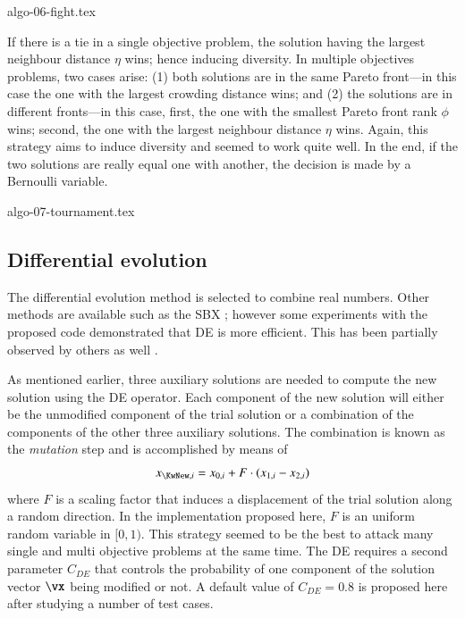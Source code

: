 \documentclass[final,5p,times,twocolumn]{elsarticle}
\begin{document}
{algo-06-fight.tex}


If there is a tie in a single objective problem, the solution having the largest neighbour distance
$\eta$ wins; hence inducing diversity. In multiple objectives problems, two cases arise: (1) both
solutions are in the same Pareto front---in this case the one with the largest crowding distance
wins; and (2) the solutions are in different fronts---in this case, first, the one with the smallest
Pareto front rank $\phi$ wins; second, the one with the largest neighbour distance $\eta$ wins.
Again, this strategy aims to induce diversity and seemed to work quite well. In the end, if the two
solutions are really equal one with another, the decision is made by a Bernoulli variable.


{algo-07-tournament.tex}



\subsection{Differential evolution}
\label{sec:DE}

The differential evolution \citep{storn:95,price:05} method is selected to combine real numbers.
Other methods are available such as the SBX \citep{deb:95a}; however some experiments with the
proposed code demonstrated that DE is more efficient. This has been partially observed by others as
well \citep{tiwari:11}.

As mentioned earlier, three auxiliary solutions are needed to compute the new solution using the DE
operator. Each component of the new solution will either be the unmodified component of the trial
solution or a combination of the components of the other three auxiliary solutions. The combination
is known as the \emph{mutation} step \citep{price:05} and is accomplished by means of
\begin{equation}
    x_{\KwNew,i} = x_{0,i} + F\cdot(x_{1,i} - x_{2,i})
\end{equation}
where $F$ is a scaling factor that induces a displacement of the trial solution along a random
direction. In the implementation proposed here, $F$ is an uniform random variable in $[0,1)$. This
strategy seemed to be the best to attack many single and multi objective problems at the
same time. The DE requires a second parameter $C_{DE}$ that controls the probability of one
component of the solution vector $\vx$ being modified or not. A default value of $C_{DE}=0.8$ is
proposed here after studying a number of test cases.
\end{document}
